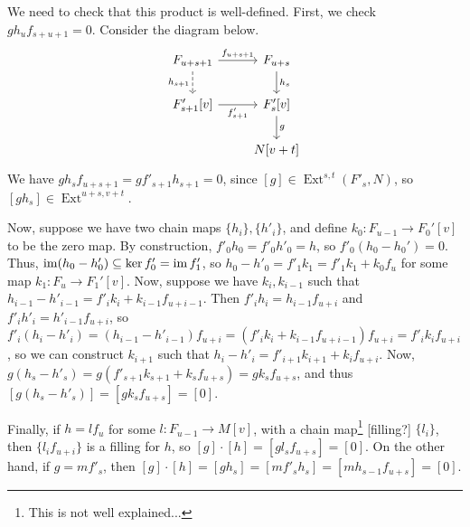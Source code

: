 \documentclass{MetricNotes2023}
\def\bb{\ensuremath\mathbb}
\def\subq{\ensuremath\subseteq}
\def\A{\ensuremath{\mathscr{A}_2}}
\DeclareMathOperator{\Ext}{Ext}
\DeclareMathOperator{\Hom}{Hom}
\DeclareMathOperator{\im}{im}
\begin{document}
We need to check that this product is well-defined. First, we check \(gh_uf_{s+u+1}=0\). Consider the diagram below.
\[\begin{tikzcd}
F_{u+s+1} \arrow[r, "f_{u+s+1}"] \arrow[d, swap, "h_{s+1}", dashrightarrow]  & F_{u+s} \arrow[d, "h_{s}"]  \\
F'_{s+1}[v] \arrow[r, swap, "f'_{s+1}"]  & F'_{s}[v] \arrow[d, "g"]\\
& N[v+t]
\end{tikzcd}\]
We have \(gh_sf_{u+s+1}=gf'_{s+1}h_{s+1}=0\), since \([g] \in \Ext^{s,t}(F'_s, N)\), so \([gh_s]\in \Ext^{u+s, v+t}\).

Now, suppose we have two chain maps \(\{h_i\}, \{h'_i\}\), and define \(k_0 : F_{u-1}\to F_0'[v]\) to be the zero map. By construction, \(f'_0h_0=f'_0h'_0=h\), so \(f'_0(h_0-h_0')=0\). Thus, \(\im(h_0-h'_0)\subq \ker f'_0=\im f'_1\), so \(h_0-h'_0=f'_1k_1=f'_1k_1+k_0f_{u}\) for some map \(k_1 : F_u \to F_1'[v]\). Now, suppose we have \(k_i, k_{i-1}\) such that \(h_{i-1}-h'_{i-1} = f'_{i}k_i+k_{i-1}f_{u+i-1}\). Then \(f'_ih_i=h_{i-1}f_{u+i}\) and \(f'_ih'_i=h'_{i-1}f_{u+i}\), so \(f'_i(h_i-h'_i)=(h_{i-1}-h'_{i-1})f_{u+i}=(f'_{i}k_i+k_{i-1}f_{u+i-1})f_{u+i}=f'_ik_if_{u+i}\), so we can construct \(k_{i+1}\) such that \(h_i-h'_i=f'_{i+1}k_{i+1}+k_if_{u+i}\). Now, \(g(h_s-h'_s)=g(f'_{s+1}k_{s+1}+k_sf_{u+s})=gk_sf_{u+s}\), and thus \([g(h_s-h'_s)]=[gk_sf_{u+s}]=[0]\).

Finally, if \(h=lf_u\) for some \(l : F_{u-1}\to M[v]\), with a chain map\footnote{This is not well explained...} [filling?] \(\{l_i\}\), then \(\{l_if_{u+i}\}\) is a filling for \(h\), so \([g]\cdot [h]=[gl_sf_{u+s}]=[0]\). On the other hand, if \(g=mf'_{s}\), then \([g]\cdot[h]=[gh_s]=[mf'_sh_s]=[mh_{s-1}f_{u+s}]=[0]\).



\end{document}
